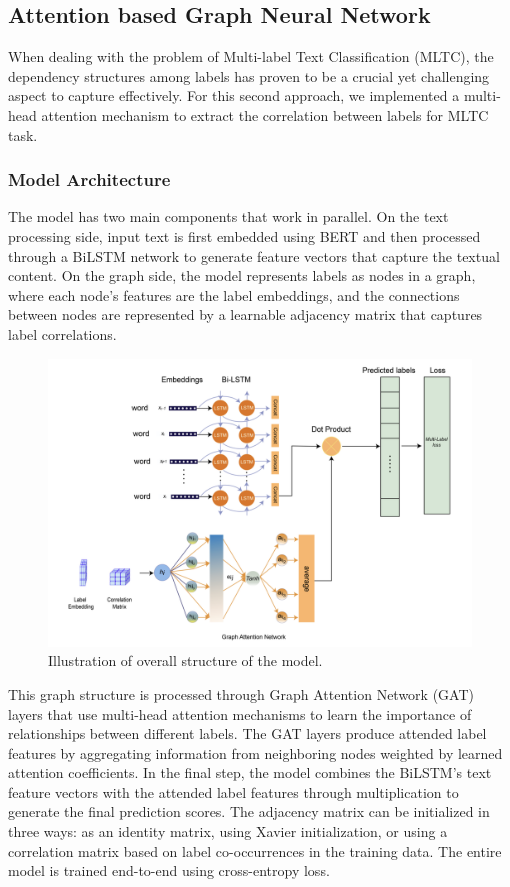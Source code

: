 \documentclass{article}
\begin{document}
\subsection{Attention based Graph Neural Network}
When dealing with the problem of Multi-label Text Classification (MLTC), the dependency structures among labels has proven to be a crucial yet challenging aspect to capture effectively. For this second approach, we implemented a multi-head attention mechanism to extract the correlation between labels for MLTC task.

\subsubsection{Model Architecture}
The model has two main components that work in parallel. On the text processing side, input text is first embedded using BERT and then processed through a BiLSTM network to generate feature vectors that capture the textual content. On the graph side, the model represents labels as nodes in a graph, where each node's features are the label embeddings, and the connections between nodes are represented by a learnable adjacency matrix that captures label correlations.
\begin{figure}[h!]
  \centering
  \includegraphics[width=\textwidth]{Magnet.png} 
  \caption{Illustration of overall structure of the model.}
  \label{fig:your-label}
\end{figure}
This graph structure is processed through Graph Attention Network (GAT) layers that use multi-head attention mechanisms to learn the importance of relationships between different labels. The GAT layers produce attended label features by aggregating information from neighboring nodes weighted by learned attention coefficients. In the final step, the model combines the BiLSTM's text feature vectors with the attended label features through multiplication to generate the final prediction scores. The adjacency matrix can be initialized in three ways: as an identity matrix, using Xavier initialization, or using a correlation matrix based on label co-occurrences in the training data. The entire model is trained end-to-end using cross-entropy loss.
\end{document}
